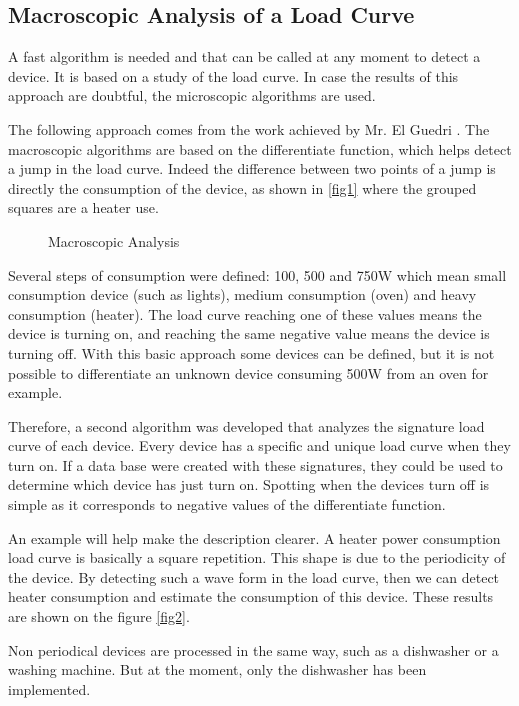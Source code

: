 \subsection{Macroscopic Analysis of a Load Curve}
A fast algorithm is needed and that can be called at any moment to detect a device. It is based on a study of the load curve. In case the results of this approach are doubtful, the microscopic algorithms are used.

The following approach comes from the work achieved by Mr. El Guedri \cite{research1}. The macroscopic algorithms are based on the differentiate function, which helps detect a jump in the load curve. Indeed the difference between two points of a jump is directly the consumption of the device, as shown in \ref{fig1} where the grouped squares are a heater use.


\begin{figure}[h]
 \begin{center}
   \caption{Macroscopic Analysis}
   \label{fig-1-1-2}
 \end{center}
\end{figure}

Several steps of consumption were defined: 100, 500 and 750W which mean small consumption device (such as lights), medium consumption (oven) and heavy consumption (heater). The load curve reaching one of these values means the device is turning on, and reaching the same negative value means the device is turning off. With this basic approach some devices can be defined, but it is not possible to differentiate an unknown device consuming 500W from an oven for example.

Therefore, a second algorithm was developed that analyzes the signature load curve of each device. Every device has a specific and unique load curve when they turn on. If a data base were created with these signatures, they could be used to determine which device has just turn on. Spotting when the devices turn off is simple as it corresponds to negative values of the differentiate function.

An example will help make the description clearer. A heater power consumption load curve is basically a square repetition. This shape is due to the periodicity of the device. By detecting such a wave form in the load curve, then we can detect heater consumption and estimate the consumption of this device. These results are shown on the figure \ref{fig2}.


Non periodical devices are processed in the same way, such as a dishwasher or a washing machine. But at the moment, only the dishwasher has been implemented.
